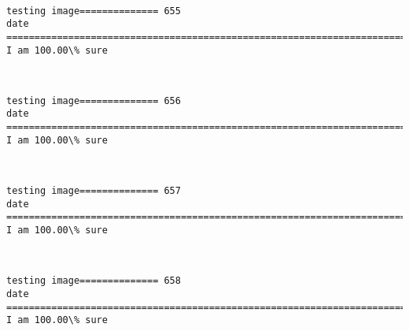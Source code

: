 \documentclass[11pt]{article}
\begin{document}
    \begin{center}
    \end{center}
    { \hspace*{\fill} \\}
    
    \begin{Verbatim}[commandchars=\\\{\}]
testing image============== 655
date
============================================================================
I am 100.00\% sure

    \end{Verbatim}

    \begin{center}
    \end{center}
    { \hspace*{\fill} \\}
    
    \begin{Verbatim}[commandchars=\\\{\}]
testing image============== 656
date
============================================================================
I am 100.00\% sure

    \end{Verbatim}

    \begin{center}
    \end{center}
    { \hspace*{\fill} \\}
    
    \begin{Verbatim}[commandchars=\\\{\}]
testing image============== 657
date
============================================================================
I am 100.00\% sure

    \end{Verbatim}

    \begin{center}
    \end{center}
    { \hspace*{\fill} \\}
    
    \begin{Verbatim}[commandchars=\\\{\}]
testing image============== 658
date
============================================================================
I am 100.00\% sure

    \end{Verbatim}
\end{document}
